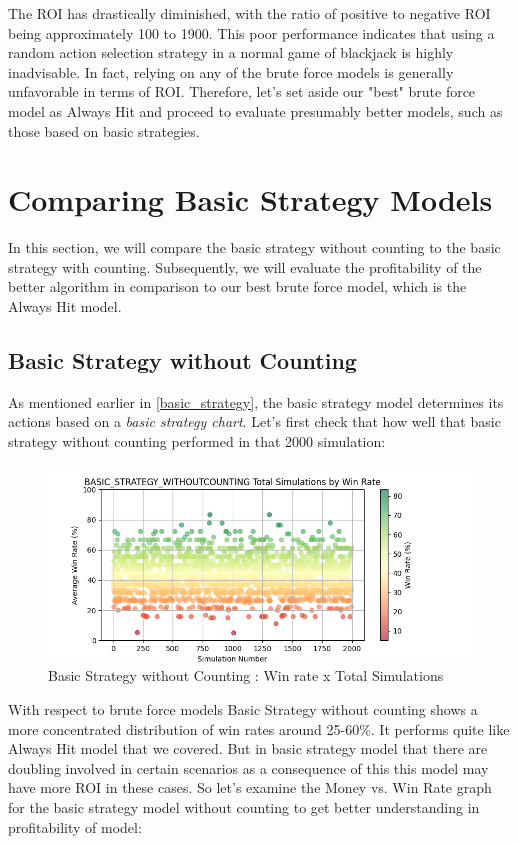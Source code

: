 \documentclass[a4paper,12pt]{report}
\begin{document}
The ROI has drastically diminished, with the ratio of positive to negative ROI being approximately 100 to 1900. This poor performance indicates that using a random action selection strategy in a normal game of blackjack is highly inadvisable. In fact, relying on any of the brute force models is generally unfavorable in terms of ROI. Therefore, let's set aside our "best" brute force model as Always Hit and proceed to evaluate presumably better models, such as those based on basic strategies.

\section{Comparing Basic Strategy Models}
In this section, we will compare the basic strategy without counting to the basic strategy with counting. Subsequently, we will evaluate the profitability of the better algorithm in comparison to our best brute force model, which is the Always Hit model.

\subsection{Basic Strategy without Counting}
As mentioned earlier in \ref{basic_strategy}, the basic strategy model determines its actions based on a \textit{basic strategy chart}. Let's first check that how well that basic strategy without counting performed in that 2000 simulation:

\begin{figure}[h]
\begin{center}
\includegraphics[scale=0.6]{figures/graphs/bswc_wr_ts.png}
\end{center}
\caption{Basic Strategy without Counting : Win rate x Total Simulations}
\label{fig:bswc_wr_ts}
\end{figure}

With respect to brute force models Basic Strategy without counting  shows a more concentrated distribution of win rates around 25-60\%. It performs quite like Always Hit model that we covered. But in basic strategy model that there are doubling involved in certain scenarios as a consequence of this this model may have more ROI in these cases. So let's examine the Money vs. Win Rate graph for the basic strategy model without counting to get better understanding in profitability of model:
 
\end{document}
